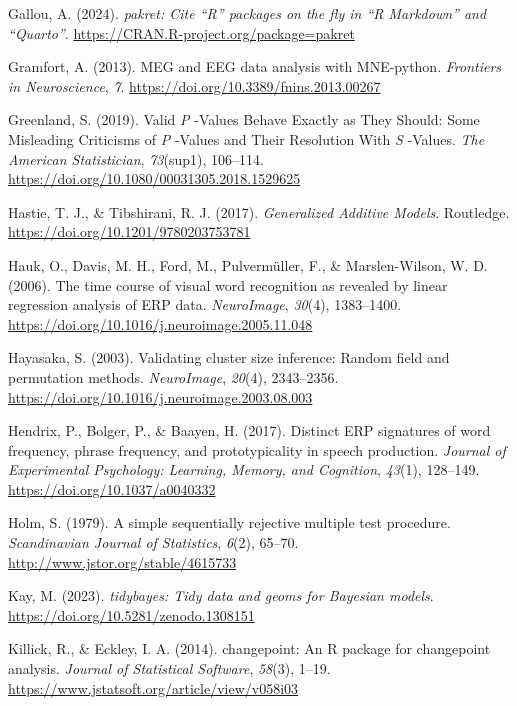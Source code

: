 \documentclass[
  doc,
  floatsintext,
  longtable,
  a4paper,
  nolmodern,
  notxfonts,
  notimes,
  colorlinks=true,linkcolor=blue,citecolor=blue,urlcolor=blue]{apa7}
\newlength{\cslhangindent}
\newenvironment{CSLReferences}[2] %
 {\begin{list}{}{%
  \setlength{\itemindent}{0pt}
  \setlength{\leftmargin}{0pt}
  \setlength{\parsep}{0pt}
  \ifodd #1
   \setlength{\leftmargin}{\cslhangindent}
   \setlength{\itemindent}{-1\cslhangindent}
  \fi
  \setlength{\itemsep}{#2\baselineskip}}}
 {\end{list}}
\begin{document}
\begin{CSLReferences}{1}{0}
Gallou, A. (2024). \emph{{pakret}: Cite {``{R}''} packages on the fly in
{``{R Markdown}''} and {``{Quarto}''}}.
\url{https://CRAN.R-project.org/package=pakret}

Gramfort, A. (2013). MEG and EEG data analysis with MNE-python.
\emph{Frontiers in Neuroscience}, \emph{7}.
\url{https://doi.org/10.3389/fnins.2013.00267}

Greenland, S. (2019). Valid {\emph{P}} -Values Behave Exactly as They
Should: Some Misleading Criticisms of {\emph{P}} -Values and Their
Resolution With {\emph{S}} -Values. \emph{The American Statistician},
\emph{73}(sup1), 106--114.
\url{https://doi.org/10.1080/00031305.2018.1529625}

Hastie, T. J., \& Tibshirani, R. J. (2017). \emph{Generalized Additive
Models}. Routledge. \url{https://doi.org/10.1201/9780203753781}

Hauk, O., Davis, M. H., Ford, M., Pulvermüller, F., \& Marslen-Wilson,
W. D. (2006). The time course of visual word recognition as revealed by
linear regression analysis of ERP data. \emph{NeuroImage}, \emph{30}(4),
1383--1400. \url{https://doi.org/10.1016/j.neuroimage.2005.11.048}

Hayasaka, S. (2003). Validating cluster size inference: Random field and
permutation methods. \emph{NeuroImage}, \emph{20}(4), 2343--2356.
\url{https://doi.org/10.1016/j.neuroimage.2003.08.003}

Hendrix, P., Bolger, P., \& Baayen, H. (2017). Distinct ERP signatures
of word frequency, phrase frequency, and prototypicality in speech
production. \emph{Journal of Experimental Psychology: Learning, Memory,
and Cognition}, \emph{43}(1), 128--149.
\url{https://doi.org/10.1037/a0040332}

Holm, S. (1979). A simple sequentially rejective multiple test
procedure. \emph{Scandinavian Journal of Statistics}, \emph{6}(2),
65--70. \url{http://www.jstor.org/stable/4615733}

Kay, M. (2023). \emph{{tidybayes}: Tidy data and geoms for {Bayesian}
models}. \url{https://doi.org/10.5281/zenodo.1308151}

Killick, R., \& Eckley, I. A. (2014). {changepoint}: An {R} package for
changepoint analysis. \emph{Journal of Statistical Software},
\emph{58}(3), 1--19.
\url{https://www.jstatsoft.org/article/view/v058i03}


\end{CSLReferences}
\end{document}
